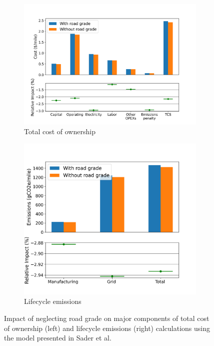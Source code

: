 \begin{figure}[ht]
    \centering
    \begin{subfigure}[b]{0.54\textwidth}
        \centering
        \includegraphics[width=\textwidth]{figures/results_comparison_costing.png}
        \caption{Total cost of ownership}
        \label{fig:results_comparison_costing}
    \end{subfigure}
    \hfill
    \begin{subfigure}[b]{0.44\textwidth}
        \centering
        \includegraphics[width=\textwidth]{figures/results_comparison_emissions.png}
        \caption{Lifecycle emissions}
        \label{fig:results_comparison_emissions}
    \end{subfigure}
    \caption{Impact of neglecting road grade on major components of total cost of ownership (left) and lifecycle emissions (right) calculations using the model presented in Sader et al. \cite{Sader_2023}}
    \label{fig:road_grade_comparison}
\end{figure}


